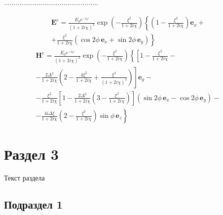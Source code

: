 \documentclass[a4paper,12pt]{article}         %
\begin{document}
.................................................

\begin{equation}            %
 \label{Eeexplicit}         %
 \begin{aligned}            %
  \mathbf E^e=\frac{E_0e^{-i\varphi}}{(1+2i\chi)^2}\exp\left(-\frac{\xi^2}      %
  {1+2i\chi}\right)\left\{\left(1-\frac{\xi^2}{1+2i\chi}\right)\mathbf          %
  e_x+\right.\\
  \left.+\frac{\xi^2}{1+2i\chi}(\cos2\phi\,\mathbf e_x+\sin2\phi\,\mathbf e_y)\right\}
 \end{aligned}
\end{equation}
\begin{equation}
 \label{Heexplicit}
 \begin{aligned}
  \mathbf H^e=\frac{E_0e^{-i\varphi}}{(1+2i\chi)^2}\exp\left(-\frac{\xi^2}
  {1+2i\chi}\right)\left\{\left[1-\frac{\xi^2}{1+2i\chi}-\right.\right.\\
  \left.-\frac{2\Delta^2}{1+2i\chi}\left(2-\frac{4\xi^2}
  {1+2i\chi}+\frac{\xi^4}{(1+2i\chi)^2}\right)\right]\mathbf e_y-\\
  -\frac{\xi^2}{1+2i\chi}\left[1-\frac{2\Delta^2}{1+2i\chi}\left(3-\frac{\xi^2}{1+2i\chi}\right)\right]
  (\sin2\phi\,\mathbf e_x-\cos2\phi\,\mathbf e_y)-\\
  \left.-\frac{4i\Delta\xi}{1+2i\chi}
  \left(2-\frac{\xi^2}{1+2i\chi}\right)\sin\phi\,\mathbf e_z\right\}
 \end{aligned}
\end{equation}


\newpage
\section{Раздел 3}

Текст раздела


\subsection{Подраздел 1}

\end{document}
